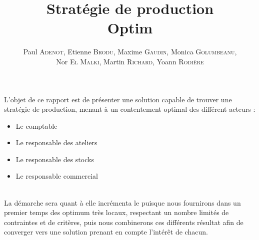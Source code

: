 \documentclass[a4paper,11pt]{article}
\title{\textbf{Stratégie de production}\\Optim}
\author{Paul \textsc{Adenot}, Etienne \textsc{Brodu}, Maxime \textsc{Gaudin},
Monica \textsc{Golumbeanu},\\ Nor \textsc{El Malki}, Martin \textsc{Richard}, Yoann \textsc{Rodière}}
\begin{document}
\maketitle
\newpage

\tableofcontents 

\begin{nAbstract}
L'objet de ce rapport est de présenter une solution capable de trouver une
stratégie de production, menant à un contentement optimal des différent
acteurs :
\begin{itemize}
  \item Le comptable
  \item Le responsable des ateliers
  \item Le responsable des stocks
  \item Le responsable commercial
\end{itemize}
~\\
La démarche sera quant à elle incrémenta le puisque nous fournirons dans un
premier temps des optimum très locaux, respectant un nombre limités de
contraintes et de critères, puis nous combinerons ces différents résultat afin
de converger vers une solution prenant en compte l'intérêt de chacun.
\end{nAbstract}






\newpage


\graphicspath{{../SourcesMatlab/}}
\graphicspath{{.}}
\end{document}
